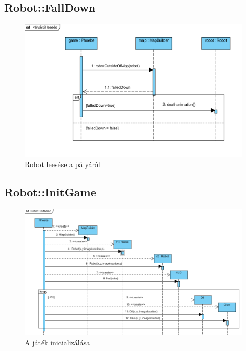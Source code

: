 \subsection{Robot::FallDown}
\begin{figure}[h]
\begin{center}
\includegraphics[width=17cm]{images/FallingDown.PNG}
\caption{Robot leesése a pályáról}
\label{fig:example6}
\end{center}
\end{figure}
\pagebreak

\subsection{Robot::InitGame}
\begin{figure}[h]
\begin{center}
\includegraphics[width=17cm]{images/RobotInitGame.PNG}
\caption{A játék inicializálása}
\label{fig:example7}
\end{center}
\end{figure}
\pagebreak

